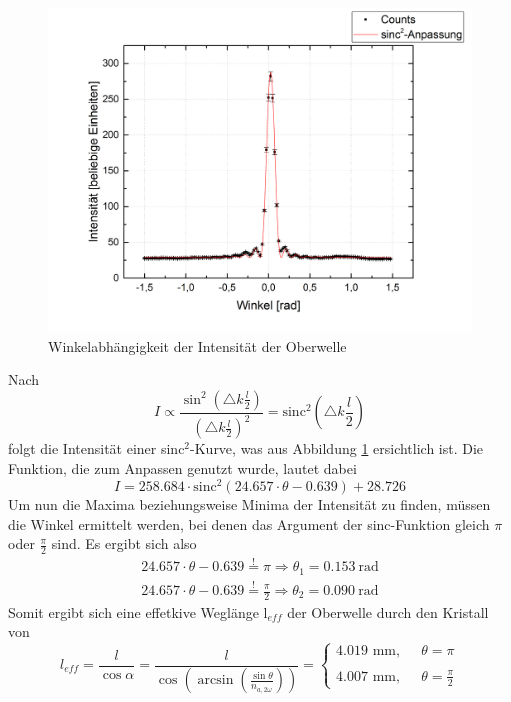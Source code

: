 \begin{figure}[H]
	\begin{center}
		\includegraphics[scale=.5]{Bilder/Winkel.png}
		\caption{Winkelabhängigkeit der Intensität der Oberwelle}
		\label{winkel}
	\end{center}
\end{figure}
Nach 
\begin{equation}
I\propto \frac{\sin^2\left(\triangle k \frac{l}{2}\right)}{\left(\triangle k \frac{l}{2}\right)^2}=\text{sinc}^2\left(\triangle k \frac{l}{2}\right)
\label{sinc}
\end{equation}
folgt die Intensität einer sinc$^2$-Kurve, was aus Abbildung \ref{winkel} ersichtlich ist. Die Funktion, die zum Anpassen genutzt wurde, lautet dabei
\begin{equation}
I=258.684\cdot\text{sinc}^2\left(24.657\cdot\theta-0.639\right)+28.726
\end{equation}
Um nun die Maxima beziehungsweise Minima der Intensität zu finden, müssen die Winkel ermittelt werden, bei denen das Argument der sinc-Funktion gleich $\pi$ oder $\frac{\pi}{2}$ sind. Es ergibt sich also
\begin{eqnarray}
24.657\cdot\theta-0.639\overset{!}{=}\pi\Longrightarrow\theta_1=0.153\:\text{rad}\\
24.657\cdot\theta-0.639\overset{!}{=}\frac{\pi}{2}\Longrightarrow\theta_2=0.090\:\text{rad}
\end{eqnarray}
Somit ergibt sich eine effetkive Weglänge l$_{eff}$ der Oberwelle durch den Kristall von 
\begin{equation}
l_{eff}=\frac{l}{\cos\alpha}=\frac{l}{\cos\left(\arcsin\left(\frac{\sin\theta}{n_{a,2\omega}}\right)\right)}=\left\{\begin{array}{ll} 4.019\text{ mm},  \;\; &\theta=\pi\\\\
4.007\text{ mm}, &\theta = \frac{\pi}{2}\end{array}\right.
\end{equation}
